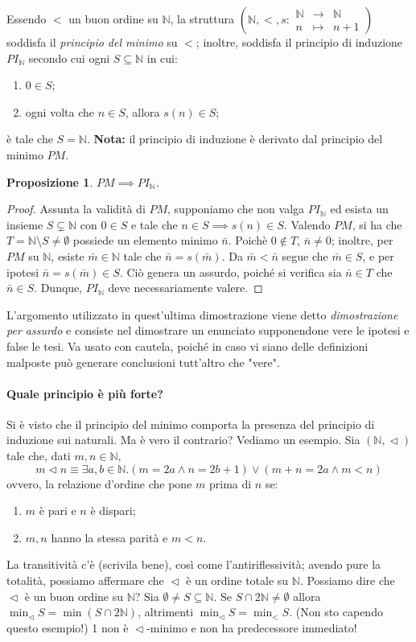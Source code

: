 \documentclass[fontsize = 11 pt, paper=A4, oneside, index=totoc, hyperref]{article}
\theoremstyle{definition}
\theoremstyle{plain}
\newtheorem{prp}{Proposizione}[section]
\newcommand{\N}{\mathbb{N}}
\newcommand{\order}{\vartriangleleft}
\begin{document}
Essendo \(<\) un buon ordine su \(\N\), la struttura \(\left(\N, <, s \colon \begin{matrix}\N & \to & \N \\ n & \mapsto & n+1\end{matrix}\right)\) soddisfa il \emph{principio del minimo} su \(<\); inoltre, soddisfa il principio di induzione \(PI_\N\) secondo cui ogni \(S \subseteq \N\) in cui:
\begin{enumerate}
  \item \(0 \in S\);
  \item ogni volta che \(n \in S\), allora \(s(n) \in S\);
\end{enumerate}
è tale che \(S = \N\). {\bf Nota:} il principio di induzione è derivato dal principio del minimo \(PM\).
\begin{prp}
  \(PM \implies PI_\N\).
\end{prp}
\begin{proof}
  Assunta la validità di \(PM\), supponiamo che non valga \(PI_\N\) ed esista un insieme \(S \subsetneq \N\) con \(0 \in S\) e tale che \(n \in S \implies s(n) \in S\). Valendo \(PM\), si ha che \(T = \N \setminus S \neq \emptyset\) possiede un elemento minimo \(\bar{n}\). Poichè \(0 \notin T\), \(\bar{n} \neq 0\); inoltre, per \(PM\) su \(\N\), esiste \(\bar{m} \in \N\) tale che \(\bar{n} = s(\bar{m})\).
  Da \(\bar{m} < \bar{n}\) segue che \(\bar{m} \in S\), e per ipotesi \(\bar{n} = s(\bar{m}) \in S\). Ciò genera un assurdo, poiché si verifica sia \(\bar{n} \in T\) che \(\bar{n} \in S\). Dunque, \(PI_\N\) deve necessariamente valere.
\end{proof}
L'argomento utilizzato in quest'ultima dimostrazione viene detto \emph{dimostrazione per assurdo} e consiste nel dimostrare un enunciato supponendone vere le ipotesi e false le tesi. Va usato con cautela, poiché in caso vi siano delle definizioni malposte può generare conclusioni tutt'altro che "vere".

\paragraph{Quale principio è più forte?} Si è visto che il principio del minimo comporta la presenza del principio di induzione sui naturali. Ma è vero il contrario? Vediamo un esempio. Sia \((\N, \order)\) tale che, dati \(m, n \in \N\),
\[
m \order n\equiv \exists a,b \in \N. (m = 2a \land n = 2b+1) \lor (m + n = 2a \land m < n)
\]
ovvero, la relazione d'ordine che pone \(m\) prima di \(n\) se:
\begin{enumerate}
  \item \(m\) è pari e \(n\) è dispari;
  \item \(m,n\) hanno la stessa parità e \(m < n\).
\end{enumerate}
La transitività c'è (scrivila bene), così come l'antiriflessività; avendo pure la totalità, possiamo affermare che \(\order\) è un ordine totale su \(\N\). Possiamo dire che \(\order\) è un buon ordine su \(\N\)?
Sia \(\emptyset \neq S \subseteq \N\). Se \(S \cap 2\N \neq \emptyset\) allora \(\min_{\order} S = \min(S\cap2\N)\), altrimenti \(\min_{\order} S = \min_{<} S\). (Non sto capendo questo esempio!) 1 non è \(\order\)-minimo e non ha predecessore immediato!
\end{document}
